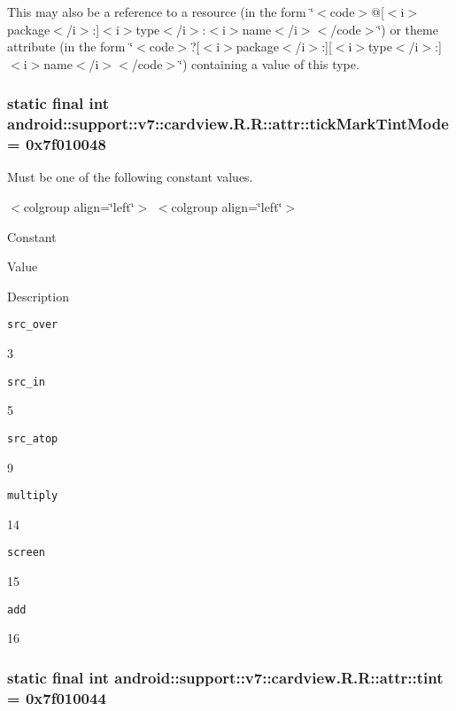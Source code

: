 This may also be a reference to a resource (in the form \char`\"{}$<$code$>$@\mbox{[}$<$i$>$package$<$/i$>$:\mbox{]}$<$i$>$type$<$/i$>$:$<$i$>$name$<$/i$>$$<$/code$>$\char`\"{}) or theme attribute (in the form \char`\"{}$<$code$>$?\mbox{[}$<$i$>$package$<$/i$>$:\mbox{]}\mbox{[}$<$i$>$type$<$/i$>$:\mbox{]}$<$i$>$name$<$/i$>$$<$/code$>$\char`\"{}) containing a value of this type. \hypertarget{classandroid_1_1support_1_1v7_1_1cardview_1_1_r_1_1attr_bcd0eacc0a750ddad15336bbfaa3b6f3}{
\subsubsection[{tickMarkTintMode}]{\setlength{\rightskip}{0pt plus 5cm}static final int android::support::v7::cardview.R.R::attr::tickMarkTintMode = 0x7f010048}}
\label{classandroid_1_1support_1_1v7_1_1cardview_1_1_r_1_1attr_bcd0eacc0a750ddad15336bbfaa3b6f3}


Must be one of the following constant values. \begin{TabularC}{0}
\hline
\end{TabularC}
$<$colgroup align=\char`\"{}left\char`\"{}$>$ $<$colgroup align=\char`\"{}left\char`\"{}$>$ 

Constant

Value

Description 

{\tt src\_\-over}

3

{\tt src\_\-in}

5

{\tt src\_\-atop}

9

{\tt multiply}

14

{\tt screen}

15

{\tt add}

16\hypertarget{classandroid_1_1support_1_1v7_1_1cardview_1_1_r_1_1attr_7fec9c6fa032168d8f1456c9ce1792b9}{
\subsubsection[{tint}]{\setlength{\rightskip}{0pt plus 5cm}static final int android::support::v7::cardview.R.R::attr::tint = 0x7f010044}}
\label{classandroid_1_1support_1_1v7_1_1cardview_1_1_r_1_1attr_7fec9c6fa032168d8f1456c9ce1792b9}


